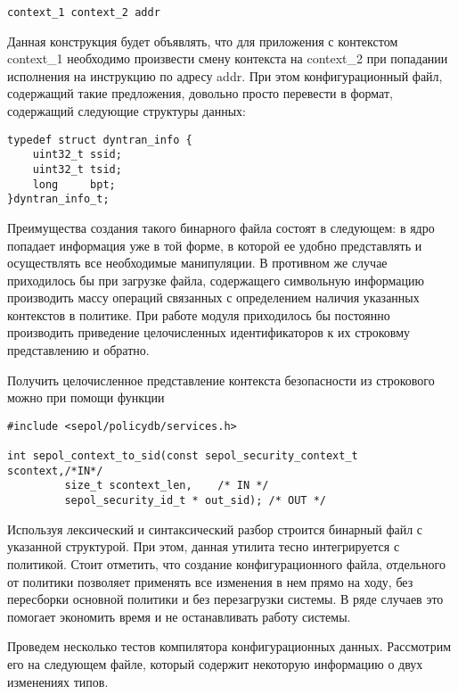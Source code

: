 \bigskip
\begin{lstlisting}
context_1 context_2 addr
\end{lstlisting}

\bigskip
Данная конструкция будет объявлять, что для приложения
с контекстом context\_1 необходимо произвести смену 
контекста на context\_2 при попадании исполнения на 
инструкцию по адресу addr. При этом конфигурационный 
файл, содержащий такие предложения, довольно просто перевести
в формат, содержащий следующие структуры данных: 

\bigskip 
\begin{lstlisting} 
typedef struct dyntran_info {
	uint32_t ssid;
	uint32_t tsid; 
	long 	 bpt;
}dyntran_info_t;
\end{lstlisting}

\bigskip
Преимущества создания такого бинарного файла состоят в следующем: 
в ядро попадает информация уже в той форме, в которой 
ее удобно представлять и осуществлять все необходимые 
манипуляции. В противном же случае приходилось бы при загрузке
файла, содержащего символьную информацию производить 
массу операций связанных с определением наличия указанных
контекстов в политике. При работе модуля приходилось бы 
постоянно производить приведение целочисленных идентификаторов
к их строковму представлению и обратно. 

Получить целочисленное представление контекста 
безопасности из строкового можно при помощи 
функции 
\begin{lstlisting}
#include <sepol/policydb/services.h>

int sepol_context_to_sid(const sepol_security_context_t scontext,/*IN*/
		 size_t scontext_len,    /* IN */
		 sepol_security_id_t * out_sid); /* OUT */
\end{lstlisting}

\bigskip

Используя лексический и синтаксический разбор 
строится бинарный файл с указанной структурой. 
При этом, данная утилита тесно интегрируется 
с политикой. Стоит отметить, что создание 
конфигурационного файла, отдельного от политики
позволяет применять все изменения в нем прямо 
на ходу, без пересборки основной политики и без
перезагрузки системы. В ряде случаев это помогает 
экономить время и не останавливать работу системы.

\bigskip
Проведем несколько тестов компилятора конфигурационных
данных. Рассмотрим его на следующем файле, который 
содержит некоторую информацию о двух изменениях 
типов. 

